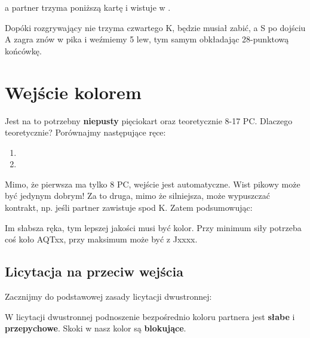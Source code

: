 \documentclass[12pt, a4paper]{article}
\begin{document}
\begin{itemize}
        a partner trzyma poniższą kartę i wistuje w .
        \begin{center}
        \end{center}
        Dopóki rozgrywający nie trzyma czwartego \spades K, będzie musiał zabić, a S po dojściu \hearts A zagra znów w pika
        i weźmiemy 5 lew, tym samym obkładając 28-punktową końcówkę.
    \end{itemize}

    \pagebreak
    \section{Wejście kolorem}
    Jest na to potrzebny \textbf{niepusty} pięciokart oraz teoretycznie 8-17 PC. Dlaczego teoretycznie?
    Porównajmy następujące ręce:
    \begin{enumerate}
        \item {}
        \item {}
    \end{enumerate}
    Mimo, że pierwsza ma tylko 8 PC, wejście jest automatyczne. Wist pikowy może być jedynym dobrym!
    Za to druga, mimo że silniejsza, może wypuszczać kontrakt, np. jeśli partner zawistuje spod \spades K.
    Zatem podsumowując:

    \begin{formal}
        Im słabsza ręka, tym lepszej jakości musi być kolor. Przy minimum siły
        potrzeba coś koło AQTxx, przy maksimum może być z Jxxxx.
    \end{formal}
    
    \subsection{Licytacja na przeciw wejścia}
    Zacznijmy do podstawowej zasady licytacji dwustronnej:
    \begin{formal}
        W licytacji dwustronnej podnoszenie bezpośrednio koloru partnera jest \textbf{słabe}
        i \textbf{przepychowe}. Skoki w nasz kolor są \textbf{blokujące}.
    \end{formal}
    
\end{document}
